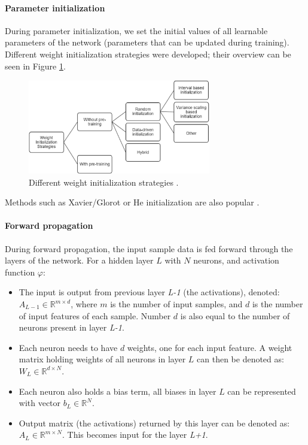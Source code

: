 \paragraph{Parameter initialization} During parameter initialization, we set the initial values of all learnable parameters of the network (parameters that can be updated during training). Different weight initialization strategies were developed; their overview can be seen in Figure \ref{fig:init}.

\begin{figure}[H]
\begin{centering}
\includegraphics[width=8cm]{assets/images/init.png}
\par\end{centering}
\caption{Different weight initialization strategies \cite{Narkhede2021}.}
\label{fig:init}
\end{figure}

Methods such as Xavier/Glorot or He initialization are also popular \cite{Abdullahi2023}.

\paragraph{Forward propagation}
During forward propagation, the input sample data is fed forward through the layers of the network. For a hidden layer $L$ with $N$ neurons, and activation function $\varphi$:

\begin{itemize}
    \item The input is output from previous layer \textit{L-1} (the activations), denoted: $A_{L-1} \in \mathbb{R}^{m \!\times\! d}$, where $m$ is the number of input samples, and $d$ is the number of input features of each sample. Number $d$ is also equal to the number of neurons present in layer \textit{L-1}.
    \item Each neuron needs to have $d$ weights, one for each input feature. A weight matrix holding weights of all neurons in layer $L$ can then be denoted as: $W_L \in \mathbb{R}^{d \!\times\! N}$.
    \item Each neuron also holds a bias term, all biases in layer $L$ can be represented with vector $b_L \in \mathbb{R}^N$.
    \item Output matrix (the activations) returned by this layer can be denoted as: $A_L \in \mathbb{R}^{m \!\times\! N}$. This becomes input for the layer \textit{L+1}.
\end{itemize}

